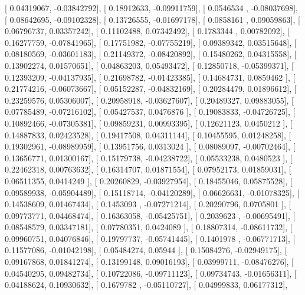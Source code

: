 \documentclass{article}
\begin{document}
       [ 0.04319067, -0.03842792],
       [ 0.18912633, -0.09911759],
       [ 0.0546534 , -0.08037698],
       [ 0.08642695, -0.09102328],
       [ 0.13726555, -0.01697178],
       [ 0.0858161 ,  0.09059863],
       [ 0.06796737,  0.03357242],
       [ 0.11102488,  0.07342492],
       [ 0.1783344 ,  0.00782092],
       [ 0.16277759, -0.07841965],
       [ 0.17751982, -0.07755219],
       [ 0.09389342,  0.03515648],
       [ 0.08180569, -0.03601183],
       [ 0.21149372, -0.08420892],
       [ 0.15480262,  0.04315558],
       [ 0.13902274,  0.01570651],
       [ 0.04863203,  0.05493472],
       [ 0.12850718, -0.05399371],
       [ 0.12393209, -0.04137935],
       [ 0.21698782, -0.01423385],
       [ 0.14684731,  0.0859462 ],
       [ 0.21774216, -0.06073667],
       [ 0.05152287, -0.04832169],
       [ 0.20284479,  0.01896612],
       [ 0.23259576,  0.05306007],
       [ 0.20958918, -0.03627607],
       [ 0.20489327,  0.09883055],
       [ 0.07785489, -0.07216102],
       [ 0.05427537,  0.0476876 ],
       [ 0.19083833, -0.04726725],
       [ 0.10892466, -0.07305381],
       [ 0.09859231,  0.00993395],
       [ 0.12621123,  0.0450212 ],
       [ 0.14887833,  0.02423528],
       [ 0.19417508,  0.04311144],
       [ 0.10455595,  0.01248258],
       [ 0.19302961, -0.08989959],
       [ 0.13951756,  0.0313024 ],
       [ 0.08089097, -0.00702464],
       [ 0.13656771,  0.01300167],
       [ 0.15179738, -0.04238722],
       [ 0.05533238,  0.0480523 ],
       [ 0.22462318,  0.00763632],
       [ 0.16314707,  0.01871554],
       [ 0.07952173,  0.01859031],
       [ 0.06511355,  0.0414249 ],
       [ 0.20260829, -0.03927954],
       [ 0.18455046,  0.05875528],
       [ 0.09589938, -0.05904489],
       [ 0.15118714, -0.04120289],
       [ 0.06626631, -0.01078325],
       [ 0.14538609,  0.01467434],
       [ 0.1453093 , -0.07271214],
       [ 0.20290796,  0.0705801 ],
       [ 0.09773771,  0.04468474],
       [ 0.16363058, -0.05425751],
       [ 0.2039623 , -0.00695491],
       [ 0.08548579,  0.03347181],
       [ 0.07780351,  0.0424089 ],
       [ 0.18807314, -0.08611732],
       [ 0.09960751,  0.04076846],
       [ 0.19797737, -0.05741445],
       [ 0.1401978 , -0.06771713],
       [ 0.11577086, -0.01042198],
       [ 0.05484274,  0.05944   ],
       [ 0.15084276, -0.02949175],
       [ 0.09167868,  0.01841274],
       [ 0.13199148,  0.09016193],
       [ 0.03999711, -0.08476276],
       [ 0.04540295,  0.09482734],
       [ 0.10722086, -0.09711123],
       [ 0.09734743, -0.01656311],
       [ 0.04188624,  0.10930632],
       [ 0.1679782 , -0.05110727],
       [ 0.04999833,  0.06177312],
\end{document}
